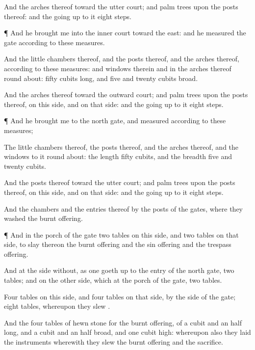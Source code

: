 {And the
arches thereof
{} toward the
utter
court; and palm
trees
{} upon the
posts thereof: and the going
up to it
{}
eight
steps.


\par }{\PP {}¶ And he
brought me into the
inner
court
toward the
east: and he
measured the
gate according to these
measures.

And the little
chambers thereof, and the
posts thereof, and the
arches thereof,
{} according to these
measures: and
{}
windows therein and in the
arches thereof round
about:
{}
fifty
cubits
long, and
five and
twenty
cubits
broad.

And the
arches thereof
{} toward the
outward
court; and palm
trees
{} upon the
posts thereof, on this side, and on that side: and the going
up to it
{}
eight
steps.


\par }{\PP {}¶ And he
brought me to the
north
gate, and
measured
{} according to these
measures;

The little
chambers thereof, the
posts thereof, and the
arches thereof, and the
windows to it round
about: the
length
{}
fifty
cubits, and the
breadth
five and
twenty
cubits.

And the
posts thereof
{} toward the
utter
court; and palm
trees
{} upon the
posts thereof, on this side, and on that side: and the going
up to it
{}
eight
steps.

And the
chambers and the
entries thereof
{} by the
posts of the
gates, where they
washed the burnt
offering.


\par }{\PP {}¶ And in the
porch of the
gate
{}
two
tables on this side, and two
tables on that side, to
slay thereon the burnt
offering and the sin
offering and the trespass
offering.

And at the
side
without, as one goeth
up to the
entry of the
north
gate,
{}
two
tables; and on the
other
side, which
{} at the
porch of the
gate,
{}
two
tables.

Four
tables
{} on this side, and
four
tables on that side, by the
side of the
gate;
eight
tables, whereupon they
slew
{}.

And the
four
tables
{} of
hewn
stone for the burnt
offering, of a
cubit and an
half
long, and a
cubit and an
half
broad, and
one
cubit
high: whereupon also they
laid the
instruments wherewith they
slew the burnt
offering and the
sacrifice.

}
